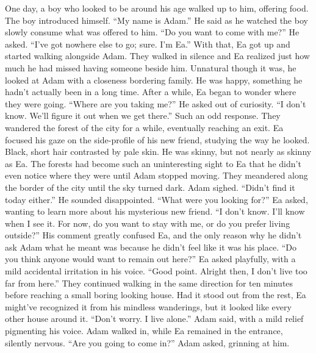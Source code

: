 \documentclass[openany, 12pt]{book}
\newcommand\tab[1][1cm]{\hspace*{#1}}
\begin{document}
\begin{itshape}
\newline
\tab
One day, a boy who looked to be around his age walked up to him, offering food. The boy introduced himself. ``My name is Adam.'' He said as he watched the boy slowly consume what was offered to him. ``Do you want to come with me?'' He asked.
\newline
\tab
``I’ve got nowhere else to go; sure. I’m Ea.'' With that, Ea got up and started walking alongside Adam. They walked in silence and Ea realized just how much he had missed having someone beside him. Unnatural though it was, he looked at Adam with a closeness bordering family. He was happy, something he hadn’t actually been in a long time. After a while, Ea began to wonder where they were going. ``Where are you taking me?'' He asked out of curiosity.
\newline
\tab
``I don’t know. We’ll figure it out when we get there.'' Such an odd response. They wandered the forest of the city for a while, eventually reaching an exit. Ea focused his gaze on the side-profile of his new friend, studying the way he looked. Black, short hair contrasted by pale skin. He was skinny, but not nearly as skinny as Ea. The forests had become such an uninteresting sight to Ea that he didn’t even notice where they were until Adam stopped moving. They meandered along the border of the city until the sky turned dark. Adam sighed. ``Didn’t find it today either.'' He sounded disappointed.
\newline
\tab
``What were you looking for?'' Ea asked, wanting to learn more about his mysterious new friend.
\newline
\tab
``I don’t know. I’ll know when I see it. For now, do you want to stay with me, or do you prefer living outside?'' His comment greatly confused Ea, and the only reason why he didn't ask Adam what he meant was because he didn't feel like it was his place.
\newline
\tab
``Do you think anyone would want to remain out here?'' Ea asked playfully, with a mild accidental irritation in his voice.
\newline
\tab
``Good point. Alright then, I don’t live too far from here.'' They continued walking in the same direction for ten minutes before reaching a small boring looking house. Had it stood out from the rest, Ea might’ve recognized it from his mindless wanderings, but it looked like every other house around it. ``Don’t worry. I live alone.'' Adam said, with a mild relief pigmenting his voice. Adam walked in, while Ea remained in the entrance, silently nervous. ``Are you going to come in?'' Adam asked, grinning at him.

\end{itshape}
\end{document}
